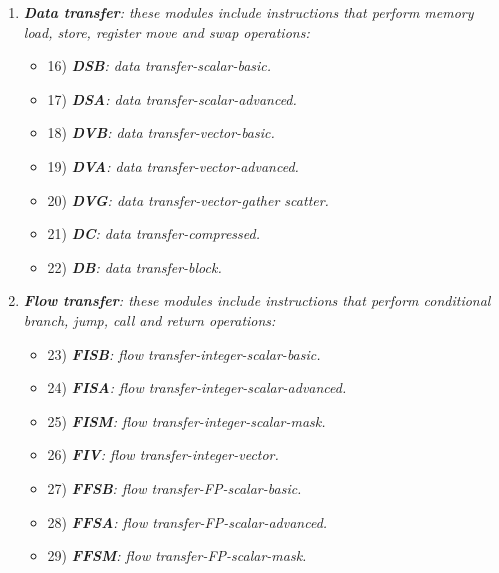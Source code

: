 \begin{enumerate}
        \item \textit{\textbf{Data transfer}: these modules include instructions that perform memory load, store, register move and swap operations:}

            \begin{itemize}

                \item 16) \textit{\textbf{DSB}: data transfer-scalar-basic.}
                \item 17) \textit{\textbf{DSA}: data transfer-scalar-advanced.}

                \item 18) \textit{\textbf{DVB}: data transfer-vector-basic.}
                \item 19) \textit{\textbf{DVA}: data transfer-vector-advanced.}
                \item 20) \textit{\textbf{DVG}: data transfer-vector-gather scatter.}

                \item 21) \textit{\textbf{DC}: data transfer-compressed.}
                \item 22) \textit{\textbf{DB}: data transfer-block.}

            \end{itemize}

        \item \textit{\textbf{Flow transfer}: these modules include instructions that perform conditional branch, jump, call and return operations:}

            \begin{itemize}

                \item 23) \textit{\textbf{FISB}: flow transfer-integer-scalar-basic.}
                \item 24) \textit{\textbf{FISA}: flow transfer-integer-scalar-advanced.}
                \item 25) \textit{\textbf{FISM}: flow transfer-integer-scalar-mask.}

                \item 26) \textit{\textbf{FIV}: flow transfer-integer-vector.}

                \item 27) \textit{\textbf{FFSB}: flow transfer-FP-scalar-basic.}
                \item 28) \textit{\textbf{FFSA}: flow transfer-FP-scalar-advanced.}
                \item 29) \textit{\textbf{FFSM}: flow transfer-FP-scalar-mask.}


\end{itemize}
\end{enumerate}
